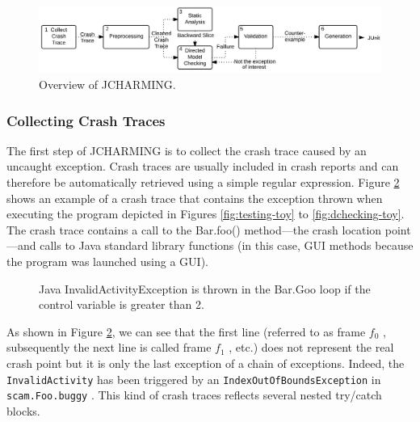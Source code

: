 \begin{figure}[h!]
  \centering
    \includegraphics[scale=0.8]{media/jcharming-approach.png}
    \caption{Overview of JCHARMING.
    \label{fig:jcarming-approach}}
\end{figure}

\subsubsection{Collecting Crash Traces}

The first step of JCHARMING is to collect the crash trace
caused by an uncaught exception. Crash traces are usually included in crash reports and can therefore be automatically
retrieved using a simple regular expression.
Figure \ref{fig:jcarming-traces} shows an example of a crash trace that contains the
exception thrown when executing the program depicted in
Figures \ref{fig:testing-toy} to \ref{fig:dchecking-toy}. The crash trace contains a call to the Bar.foo()
method—the crash location point—and calls to Java standard
library functions (in this case, GUI methods because the
program was launched using a GUI).

\begin{figure}[h!]
  \noindent{}
    \caption{Java InvalidActivityException is thrown in the Bar.Goo loop if the control variable is greater than 2.
    \label{fig:jcarming-traces}}
\end{figure}

As shown in Figure \ref{fig:jcarming-traces}, we can see that the first line (referred to
as frame {\it $f_0$} , subsequently the next line is called frame {\it $f_1$} , etc.)
does not represent the real crash point but it is only the last
exception of a chain of exceptions. Indeed, the {\tt InvalidActivity}
has been triggered by an {\tt IndexOutOfBoundsException} in
{\tt scam.Foo.buggy} . This kind of crash traces reflects several
nested try/catch blocks.

